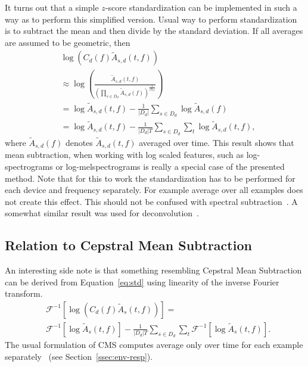 \documentclass[a4paper]{article}
\newcommand{\va}{A}
\newcommand{\vc}{C}
\newcommand{\vD}{D}
\newcommand{\vs}{s}
\newcommand{\ff}{f}
\newcommand{\dd}{d}
\newcommand{\ampltf}[1]{\widetilde{\va}_{#1}\left(t,\ff\right)}
\newcommand{\amplf}[1]{\widetilde{\va}_{#1}\left(\ff\right)}
\newcommand{\coeff}[1]{\vc_{#1}\left(\ff\right)}
\begin{document}
It turns out that a simple $z$-score standardization can be implemented in such a way as to perform this simplified version. Usual way to perform standardization is to subtract the mean and then divide by the standard deviation. If all averages are assumed to be geometric, then
\begin{align}
    &\log\left(\coeff{\dd}\ampltf{\vs, \dd}\right) \\
&\approx\log\left(\frac{\ampltf{\vs, \dd}} {\left(\prod_{\vs\in D_\dd}\amplf{\vs, \dd}\right)^{\frac{1}{\left|\vD_\dd\right|}}}\right) \\
    &= \log\ampltf{\vs, \dd} - \frac{1}{\left|\vD_\dd\right|}\sum_{\vs\in D_\dd}\log\amplf{\vs, \dd} \\ 
    &= \log\ampltf{\vs, \dd} - \frac{1}{\left|\vD_\dd\right|T}\sum_{\vs\in D_\dd}\sum_{t}\log\ampltf{\vs, \dd},
    \label{eq:std}
\end{align}
where $\amplf{\vs, \dd}$ denotes $\ampltf{\vs, \dd}$ averaged over time.
This result shows that mean subtraction, when working with log scaled features, such as log-spectrograms or log-melspectrograms is really a special case of the presented method. Note that for this to work the standardization has to be performed for each device and frequency separately. For example average over all examples does not create this effect.
This should not be confused with spectral subtraction~\cite{bollSuppressionAcousticNoise1979}. A somewhat similar result was used for deconvolution~\cite{stockhamBlindDeconvolutionDigital1975}.

\subsection{Relation to Cepstral Mean Subtraction}

An interesting side note is that something resembling Cepstral Mean Subtraction can be derived from Equation~\eqref{eq:std} using linearity of the inverse Fourier transform.
\begin{align}
&\mathcal{F}^{-1}\left[\log\left(\coeff{\dd}\ampltf{\vs}\right)\right] = \\ 
    &\mathcal{F}^{-1}\left[\log\ampltf{\vs}\right]
    - \frac{1}{\left|\vD_\dd\right|T}\sum_{\vs\in D_\dd}\sum_{t}\mathcal{F}^{-1}\left[\log\ampltf{\vs}\right]. 
    \nonumber
\end{align}
\noindent The usual formulation of CMS computes average only over time for each example separately~\cite{mammoneRobustSpeakerRecognition1996} (see Section~\ref{ssec:env-resp}). 
\end{document}
